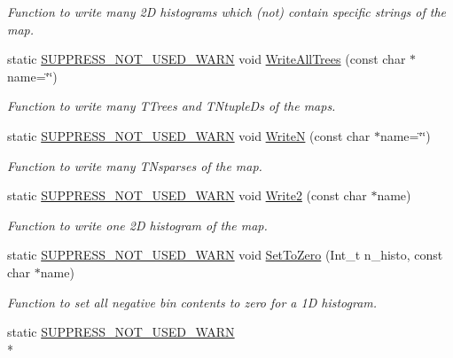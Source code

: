 \begin{DoxyCompactItemize}
\begin{DoxyCompactList}\small\item\em Function to write many 2\-D histograms which (not) contain specific strings of the map. \end{DoxyCompactList}\item 
static \hyperlink{HistClass_8hh_a85edd6ac47f5ea2970c76af20855738c}{S\-U\-P\-P\-R\-E\-S\-S\-\_\-\-N\-O\-T\-\_\-\-U\-S\-E\-D\-\_\-\-W\-A\-R\-N} void \hyperlink{namespaceHistClass_a3f0a61ef88b8603ea99d534c15f9c657}{Write\-All\-Trees} (const char $\ast$name=\char`\"{}\char`\"{})
\begin{DoxyCompactList}\small\item\em Function to write many T\-Trees and T\-Ntuple\-Ds of the maps. \end{DoxyCompactList}\item 
static \hyperlink{HistClass_8hh_a85edd6ac47f5ea2970c76af20855738c}{S\-U\-P\-P\-R\-E\-S\-S\-\_\-\-N\-O\-T\-\_\-\-U\-S\-E\-D\-\_\-\-W\-A\-R\-N} void \hyperlink{namespaceHistClass_a6fc4f287969f4f5fc0e92074d1e7099c}{Write\-N} (const char $\ast$name=\char`\"{}\char`\"{})
\begin{DoxyCompactList}\small\item\em Function to write many T\-Nsparses of the map. \end{DoxyCompactList}\item 
static \hyperlink{HistClass_8hh_a85edd6ac47f5ea2970c76af20855738c}{S\-U\-P\-P\-R\-E\-S\-S\-\_\-\-N\-O\-T\-\_\-\-U\-S\-E\-D\-\_\-\-W\-A\-R\-N} void \hyperlink{namespaceHistClass_a3acb67cee663e4c97d5ce0645139715b}{Write2} (const char $\ast$name)
\begin{DoxyCompactList}\small\item\em Function to write one 2\-D histogram of the map. \end{DoxyCompactList}\item 
static \hyperlink{HistClass_8hh_a85edd6ac47f5ea2970c76af20855738c}{S\-U\-P\-P\-R\-E\-S\-S\-\_\-\-N\-O\-T\-\_\-\-U\-S\-E\-D\-\_\-\-W\-A\-R\-N} void \hyperlink{namespaceHistClass_a24772b9dfe740281c6f265d735544bef}{Set\-To\-Zero} (Int\-\_\-t n\-\_\-histo, const char $\ast$name)
\begin{DoxyCompactList}\small\item\em Function to set all negative bin contents to zero for a 1\-D histogram. \end{DoxyCompactList}\item 
static \hyperlink{HistClass_8hh_a85edd6ac47f5ea2970c76af20855738c}{S\-U\-P\-P\-R\-E\-S\-S\-\_\-\-N\-O\-T\-\_\-\-U\-S\-E\-D\-\_\-\-W\-A\-R\-N} \\*

\end{DoxyCompactItemize}
